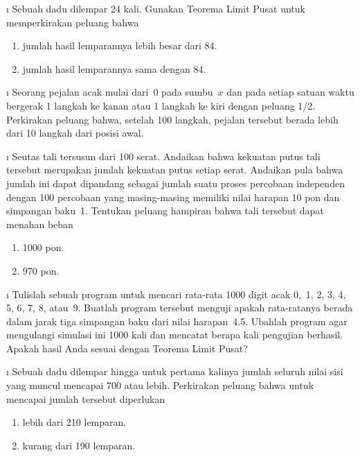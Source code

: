 
\exercises
\begin{LJSItem}

\i\label{exer 9.2.100}  Sebuah dadu dilempar 24 kali.  Gunakan Teorema Limit Pusat untuk
memperkirakan peluang bahwa
\begin{enumerate}
\item  jumlah hasil lemparannya lebih besar dari 84.

\item  jumlah hasil lemparannya sama dengan 84.
\end{enumerate}

\i\label{exer 9.2.101}  Seorang pejalan acak mulai dari~0 pada sumbu~$x$ dan pada setiap satuan
waktu bergerak 1 langkah ke kanan atau 1 langkah ke kiri dengan peluang 1/2.  Perkirakan peluang
bahwa, setelah 100 langkah, pejalan tersebut berada lebih dari 10 langkah dari posisi awal.

\i\label{exer 9.2.102}  Seutas tali tersusun dari 100 serat.  Andaikan bahwa kekuatan putus tali
tersebut merupakan jumlah kekuatan putus setiap serat.  Andaikan pula bahwa jumlah ini dapat
dipandang sebagai jumlah suatu proses percobaan independen dengan 100 percobaan yang masing-masing
memiliki nilai harapan 10 pon dan simpangan baku~1.  Tentukan peluang hampiran bahwa tali tersebut
dapat menahan beban
\begin{enumerate}
\item  1000 pon.

\item  970 pon.
\end{enumerate}

\i\label{exer 9.2.103}  Tulislah sebuah program untuk mencari rata-rata 1000 digit acak
0,~1, 2, 3, 4, 5, 6, 7, 8, atau~9.  Buatlah program tersebut menguji apakah rata-ratanya berada
dalam jarak tiga simpangan baku dari nilai harapan~4.5.  Ubahlah program agar mengulangi simulasi
ini 1000 kali dan mencatat berapa kali pengujian berhasil.  Apakah hasil Anda sesuai dengan
Teorema Limit Pusat?

\i\label{exer 9.2.104}  Sebuah dadu dilempar hingga untuk pertama kalinya jumlah seluruh nilai sisi
yang muncul mencapai 700 atau lebih.  Perkirakan peluang bahwa untuk mencapai jumlah tersebut diperlukan
\begin{enumerate}
\item  lebih dari 210 lemparan.

\item  kurang dari 190 lemparan.


\end{enumerate}
\end{LJSItem}
